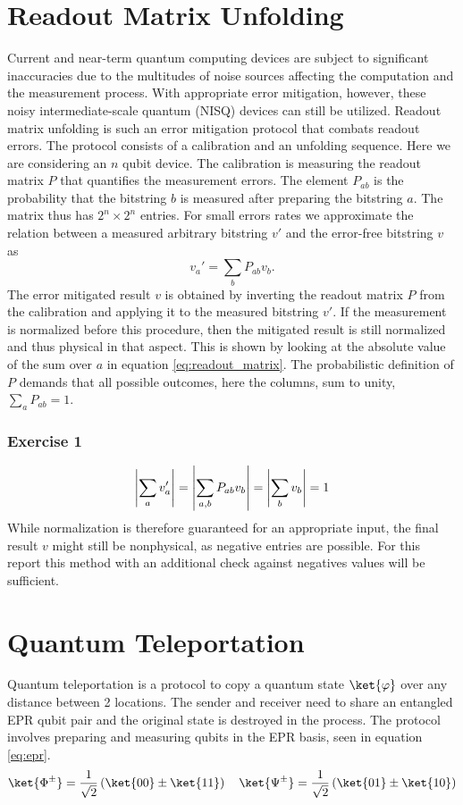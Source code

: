 \section{Readout Matrix Unfolding}
Current and near-term quantum computing devices are subject to significant inaccuracies due to the multitudes of noise sources affecting the computation and the measurement process. With appropriate error mitigation, however, these noisy intermediate-scale quantum (NISQ) devices can still be utilized. Readout matrix unfolding is such an error mitigation protocol that combats readout errors. The protocol consists of a calibration and an unfolding sequence. Here we are considering an $n$ qubit device. The calibration is measuring the readout matrix $P$ that quantifies the measurement errors. The element $P_{ab}$ is the probability that the bitstring $b$ is measured after preparing the bitstring $a$. The matrix thus has $2^n\times2^n$ entries. For small errors rates we approximate the relation between a measured arbitrary bitstring $v'$ and the error-free bitstring $v$ as
\begin{equation}
    v_a' = \sum_b P_{ab}v_b .
    \label{eq:readout_matrix}
\end{equation}
The error mitigated result $v$ is obtained by inverting the readout matrix $P$ from the calibration and applying it to the measured bitstring $v'$. If the measurement is normalized before this procedure, then the mitigated result is still normalized and thus physical in that aspect. This is shown by looking at the absolute value of the sum over $a$ in equation \eqref{eq:readout_matrix}. The probabilistic definition of $P$ demands that all possible outcomes, here the columns, sum to unity, $\sum_a P_{ab} = 1$.
\subsubsection{Exercise 1}
\begin{equation}
        \left|\sum_a v_a'\right| = \left|\sum_{a,b}P_{ab}v_b\right| = \left|\sum_b v_b\right| = 1
\end{equation}
While normalization is therefore guaranteed for an appropriate input, the final result $v$ might still be nonphysical, as negative entries are possible. For this report this method with an additional check against negatives values will be sufficient.
\section{Quantum Teleportation}
Quantum teleportation is a protocol to copy a quantum state $\ket{\varphi}$ over any distance between 2 locations. The sender and receiver need to share an entangled EPR qubit pair and the original state is destroyed in the process. The protocol involves preparing and measuring qubits in the EPR basis, seen in equation \eqref{eq:epr}.
\begin{equation}
    \ket{\Phi^\pm} = \frac{1}{\sqrt{2}}\left(\ket{00} \pm \ket{11}\right) \quad
    \ket{\Psi^\pm}  = \frac{1}{\sqrt{2}}\left(\ket{01} \pm \ket{10}\right)
    \label{eq:epr}
\end{equation}
